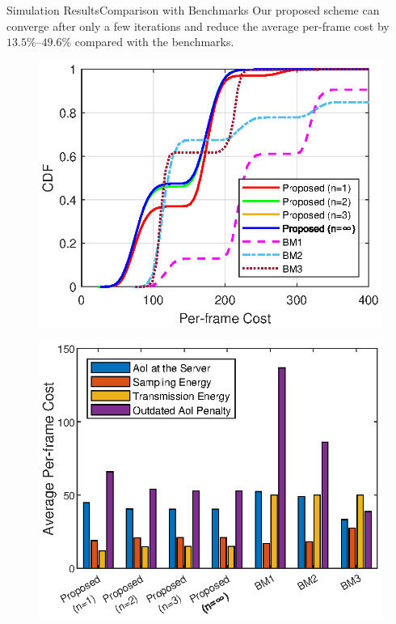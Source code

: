 \documentclass[aspectratio=169]{beamer}
\begin{document}
\begin{frame}{Simulation Results}{Comparison with Benchmarks}
    Our proposed scheme can converge after only a few iterations and reduce the average per-frame cost by $13.5\%$--$49.6\%$ compared with the benchmarks.
    \begin{minipage}[t]{0.45\linewidth}
        \begin{figure}
            \centering
            \includegraphics[width=0.8\linewidth]{fig/CDF.eps}
        \end{figure}
    \end{minipage}
    \hspace{0.01\linewidth}
    \begin{minipage}[t]{0.45\linewidth}
        \begin{figure}[htb]
            \centering
            \includegraphics[width=0.8\linewidth]{fig/barplot.eps}
        \end{figure}
    \end{minipage}
\end{frame}
\end{document}
